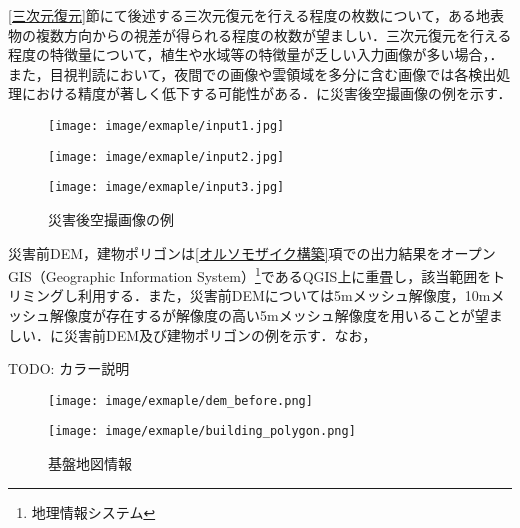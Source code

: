     \ref{三次元復元}節にて後述する三次元復元を行える程度の枚数について，ある地表物の複数方向からの視差が得られる程度の枚数が望ましい．三次元復元を行える程度の特徴量について，植生や水域等の特徴量が乏しい入力画像が多い場合，．また，目視判読において，夜間での画像や雲領域を多分に含む画像では各検出処理における精度が著しく低下する可能性がある．に災害後空撮画像の例を示す．

    \begin{figure}[tbp]
      \begin{minipage}[c]{0.329\hsize}
        \centering
        \texttt{[image: image/exmaple/input1.jpg]}
        \label{入力画像例1}
      \end{minipage}
      \begin{minipage}[c]{0.329\hsize}
        \centering
        \texttt{[image: image/exmaple/input2.jpg]}
        \label{入力画像例2}
      \end{minipage}
      \begin{minipage}[c]{0.329\hsize}
        \centering
        \texttt{[image: image/exmaple/input3.jpg]}
        \label{入力画像例3}
      \end{minipage}
      \caption{災害後空撮画像の例}
      \label{空撮画像例}
    \end{figure}

    災害前DEM，建物ポリゴンは\ref{オルソモザイク構築}項での出力結果をオープンGIS（Geographic Information System）\footnote{地理情報システム}であるQGIS\cite{QGIS}上に重畳し，該当範囲をトリミングし利用する．また，災害前DEMについては5mメッシュ解像度，10mメッシュ解像度が存在するが解像度の高い5mメッシュ解像度を用いることが望ましい．に災害前DEM及び建物ポリゴンの例を示す．なお，

    TODO: カラー説明

    \begin{figure}[tbp]
      \begin{minipage}[c]{0.45\hsize}
        \centering
        \texttt{[image: image/exmaple/dem\_before.png]}
      \end{minipage}
      \begin{minipage}[c]{0.45\hsize}
        \centering
        \texttt{[image: image/exmaple/building\_polygon.png]}
      \end{minipage}
      \caption{基盤地図情報}
      \label{基盤地図情報}
    \end{figure}


